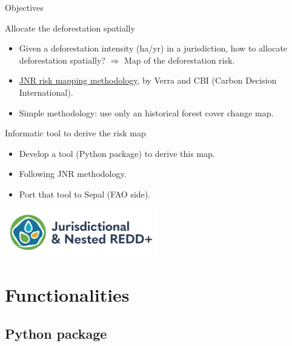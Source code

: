 \documentclass[10pt,table,dvipsnames,compress]{beamer}
\begin{document}
\begin{frame}[label={sec:orgc2cd170}]{Objectives}
\begin{block}{Allocate the deforestation spatially}
\begin{itemize}
\item Given a deforestation intensity (ha/yr) in a jurisdiction, how to allocate deforestation spatially? \alert{\(\Rightarrow\) Map of the deforestation risk}.
\item \href{https://verra.org/wp-content/uploads/2021/04/DRAFT\_JNR\_Risk\_Mapping\_Tool\_15APR2021.pdf}{JNR risk mapping methodology}, by Verra and CBI (Carbon Decision International).
\item Simple methodology: use only an historical forest cover change map.
\end{itemize}
\end{block}

\begin{block}{Informatic tool to derive the risk map}
\begin{itemize}
\item Develop a tool (Python package) to derive this map.
\item Following JNR methodology.
\item Port that tool to Sepal (FAO side).
\end{itemize}

\begin{center}
\includegraphics[width=0.5\textwidth]{figs/jnr.png}
\end{center}
\end{block}
\end{frame}

\section{Functionalities}
\label{sec:orgd0d0d84}

\subsection{Python package}
\label{sec:org3193f07}
\end{document}
